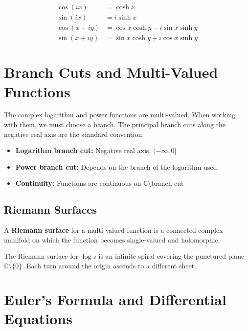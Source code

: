 \begin{theorem}
\begin{align*}
\cos(ix) &= \cosh x \\
\sin(ix) &= i\sinh x \\
\cos(x + iy) &= \cos x \cosh y - i\sin x \sinh y \\
\sin(x + iy) &= \sin x \cosh y + i\cos x \sinh y
\end{align*}
\end{theorem}

\section{Branch Cuts and Multi-Valued Functions}

The complex logarithm and power functions are multi-valued. When working with them,
we must choose a branch. The principal branch cuts along the negative real axis
are the standard convention.

\begin{itemize}
\item \textbf{Logarithm branch cut:} Negative real axis, $(-\infty, 0]$
\item \textbf{Power branch cut:} Depends on the branch of the logarithm used
\item \textbf{Continuity:} Functions are continuous on $\mathbb{C} \setminus \text{branch cut}$
\end{itemize}

\subsection{Riemann Surfaces}

\begin{definition}
A \textbf{Riemann surface} for a multi-valued function is a connected complex manifold
on which the function becomes single-valued and holomorphic.
\end{definition}

\begin{example}
The Riemann surface for $\log z$ is an infinite spiral covering the punctured plane $\mathbb{C} \setminus \{0\}$.
Each turn around the origin ascends to a different sheet.
\end{example}

\section{Euler's Formula and Differential Equations}

